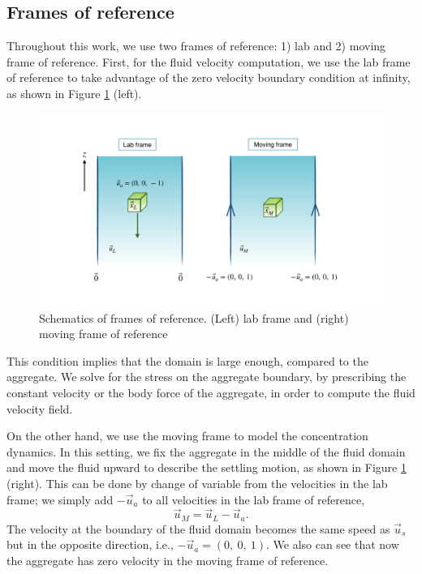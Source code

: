 \subsection{Frames of reference}
Throughout this work, we use two frames of reference: 1) lab and 2) moving frame of reference. First, for the fluid velocity computation, we use the lab frame of reference to take advantage of the zero velocity boundary condition at infinity, as shown in Figure \ref{fig_frame_ref} (left). 
\begin{figure}[h]
	\begin{center}
		\includegraphics[scale=0.25]{figures/fig_frame_ref}
	\end{center}
	\caption{Schematics of frames of reference. (Left) lab frame and (right) moving frame of reference }
	\label{fig_frame_ref}
\end{figure}
This condition implies that the domain is large enough, compared to the aggregate.
We solve for the stress on the aggregate boundary, by prescribing the constant velocity or the body force of the aggregate, in order to compute the fluid velocity field. 
\par
On the other hand, we use the moving frame to model the concentration dynamics.
In this setting, we fix the aggregate in the middle of the fluid domain and move the fluid upward to describe the settling motion, as shown in Figure \ref{fig_frame_ref} (right).
This can be done by change of variable from the velocities in the lab frame; we simply add $-\vec{u}_a$ to all velocities in the lab frame of reference,
\[
\vec{u}_M = \vec{u}_L - \vec{u}_a.
\]
 The velocity at the boundary of the fluid domain becomes the same speed as $\vec{u}_s$ but in the opposite direction, i.e., $-\vec{u}_a = (0, \ 0, \ 1)$. We also can see that now the aggregate has zero velocity in the moving frame of reference.

